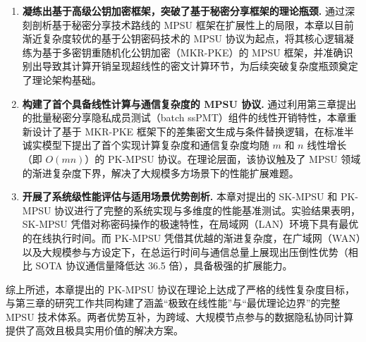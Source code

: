 \begin{enumerate}
\item \textbf{凝练出基于高级公钥加密框架，突破了基于秘密分享框架的理论瓶颈.} 通过深刻剖析基于秘密分享技术路线的 MPSU 框架在扩展性上的局限，本章以目前渐近复杂度较优的基于公钥密码技术的 MPSU 协议为起点，将其核心逻辑凝练为基于多密钥重随机化公钥加密（MKR-PKE）的 MPSU 框架，并准确识别出导致其计算开销呈现超线性的密文计算环节，为后续突破复杂度瓶颈奠定了理论架构基础。

\item \textbf{构建了首个具备线性计算与通信复杂度的 MPSU 协议.} 
通过利用第三章提出的批量秘密分享隐私成员测试（batch ssPMT）组件的线性开销特性，本章重新设计了基于 MKR-PKE 框架下的差集密文生成与条件替换逻辑，在标准半诚实模型下提出了首个实现计算复杂度和通信复杂度均随 $m$ 和 $n$ 线性增长（即 $O(mn)$）的 PK-MPSU 协议。在理论层面，该协议触及了 MPSU 领域的渐进复杂度下界，解决了大规模多方场景下的性能扩展难题。

\item \textbf{开展了系统级性能评估与适用场景优势剖析.} 本章对提出的 SK-MPSU 和 PK-MPSU 协议进行了完整的系统实现与多维度的性能基准测试。实验结果表明，SK-MPSU 凭借对称密码操作的极速特性，在局域网（LAN）环境下具有最优的在线执行时间。而 PK-MPSU 凭借其优越的渐进复杂度，在广域网（WAN）以及大规模参与方设定下，在总运行时间与通信总量上展现出压倒性优势（相比 SOTA 协议通信量降低达 36.5 倍），具备极强的扩展能力。
\end{enumerate}

综上所述，本章提出的 PK-MPSU 协议在理论上达成了严格的线性复杂度目标，与第三章的研究工作共同构建了涵盖“极致在线性能”与“最优理论边界”的完整 MPSU 技术体系。两者优势互补，为跨域、大规模节点参与的数据隐私协同计算提供了高效且极具实用价值的解决方案。